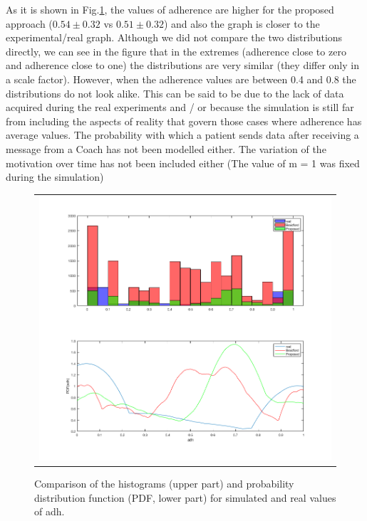 \documentclass{llncs}
\begin{document}
As it is shown in Fig.\ref{Fig.REALvsSIM}, the values of adherence are higher for the proposed approach ($0.54\pm0.32$ vs $0.51\pm0.32$) and also the graph is closer to the experimental/real graph. Although we did not compare the two distributions directly, we can see in the figure that in the extremes (adherence close to zero and adherence close to one) the distributions are very similar (they differ only in a scale factor). However, when the adherence values are between 0.4 and 0.8 the distributions do not look alike. This can be said to be due to the lack of data acquired during the real experiments and / or because the simulation is still far from including the aspects of reality that govern those cases where adherence has average values. The probability with which a patient sends data after receiving a message from a Coach has not been modelled either. The variation of the motivation over time has not been included either (The value of m = 1 was fixed during the simulation)
\begin{figure}
  \begin{center}
  \begin{tabular}{c}
    \includegraphics[scale=0.4]{REALvsBRAIDFORDvsPROPOSED.png}\\
    \end{tabular}
    \caption{Comparison of the histograms (upper part) and probability distribution function (PDF, lower part) for simulated and real values of adh.}
     \label{Fig.REALvsSIM}
\end{center}
\end{figure} 
\end{document}
